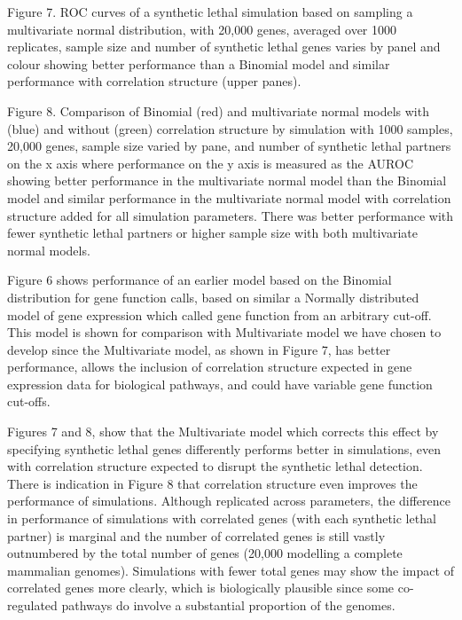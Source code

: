 Figure 7.   \gls{ROC} curves of a \gls{synthetic lethal} simulation based on sampling a multivariate normal distribution, with 20,000 genes, averaged over 1000 replicates, sample size and number of \gls{synthetic lethal} genes varies by panel and colour showing better performance than a Binomial model and similar performance with correlation structure (upper panes).

Figure 8.  Comparison of Binomial (red) and multivariate normal models with (blue) and without (green) correlation structure by simulation with 1000 samples, 20,000 genes, sample size varied by pane, and number of \gls{synthetic lethal} partners on the x axis where performance on the y axis is measured as the \gls{AUROC} showing better performance in the multivariate normal model than the Binomial model and similar performance in the multivariate normal model with correlation structure added for all simulation parameters.  There was better performance with fewer \gls{synthetic lethal} partners or higher sample size with both multivariate normal models.   

Figure 6 shows performance of an earlier model based on the Binomial distribution for gene function calls, based on similar a Normally distributed model of \gls{gene expression} which called gene function from an arbitrary  cut-off.  This model is shown for comparison with Multivariate model we have chosen to develop since the Multivariate model, as shown in Figure 7, has better performance, allows the inclusion of correlation structure expected in \gls{gene expression} data for biological pathways, and could have variable gene function cut-offs.  

Figures 7 and 8, show that the Multivariate model which corrects this effect by specifying \gls{synthetic lethal} genes differently performs better in simulations, even with correlation structure expected to disrupt the \gls{synthetic lethal} detection.  There is indication in Figure 8 that correlation structure even improves the performance of simulations.  Although replicated across parameters, the difference in performance of simulations with correlated genes (with each \gls{synthetic lethal} partner) is marginal and the number of correlated genes is still vastly outnumbered by the total number of genes (20,000 modelling a complete mammalian \glspl{genome}).  Simulations with fewer total genes may show the impact of correlated genes more clearly, which is biologically plausible since some co-regulated pathways do involve a substantial proportion of the \glspl{genome}.

